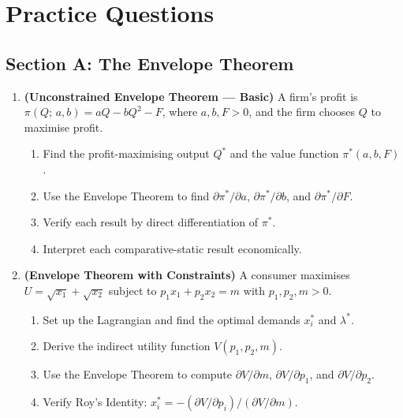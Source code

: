 \documentclass[12pt, a4paper]{article}
\theoremstyle{definition}
\begin{document}
\newpage
\section{Practice Questions}

\subsection{Section A: The Envelope Theorem}

\begin{enumerate}[label=\textbf{A\arabic*.}, leftmargin=2.5em]

\item \textbf{(Unconstrained Envelope Theorem --- Basic)}
A firm's profit is $\pi(Q;\,a,b) = aQ - bQ^2 - F$, where $a,b,F>0$,
and the firm chooses $Q$ to maximise profit.
\begin{enumerate}[label=(\alph*)]
  \item Find the profit-maximising output $Q^*$ and the value function
        $\pi^*(a,b,F)$.
  \item Use the Envelope Theorem to find $\partial\pi^*/\partial a$,
        $\partial\pi^*/\partial b$, and $\partial\pi^*/\partial F$.
  \item Verify each result by direct differentiation of $\pi^*$.
  \item Interpret each comparative-static result economically.
\end{enumerate}

\item \textbf{(Envelope Theorem with Constraints)}
A consumer maximises $U = \sqrt{x_1} + \sqrt{x_2}$ subject to
$p_1 x_1 + p_2 x_2 = m$ with $p_1, p_2, m > 0$.
\begin{enumerate}[label=(\alph*)]
  \item Set up the Lagrangian and find the optimal demands $x_i^*$ and
        $\lambda^*$.
  \item Derive the indirect utility function $V(p_1,p_2,m)$.
  \item Use the Envelope Theorem to compute $\partial V/\partial m$,
        $\partial V/\partial p_1$, and $\partial V/\partial p_2$.
  \item Verify Roy's Identity: $x_i^* = -(\partial V/\partial p_i)/(\partial V/\partial m)$.
\end{enumerate}


\end{enumerate}
\end{document}
